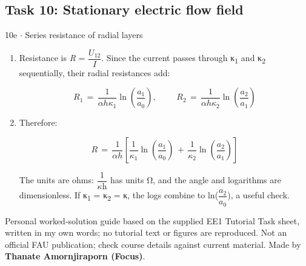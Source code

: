 \documentclass[11pt]{article}
\begin{document}
\begin{keepsection}\subsection{Task 10: Stationary electric flow field}

\begin{workedbox}{10e \ensuremath{\cdot} Series resistance of radial layers}
\begin{enumerate}
\item {}
Resistance is \textit{R} = {\small\ensuremath{\dfrac{{U}_{12}}{{I}}}}. Since the current passes through κ\textsubscript{1} and κ\textsubscript{2} sequentially, their radial resistances add:

\begin{equation*}{R}_{1}\, =\, \dfrac{1}{α{h}κ_{1}}\ln \left(\dfrac{{a}_{1}}{{a}_{0}}\right),\quad \, \quad \, {R}_{2}\, =\, \dfrac{1}{α{h}κ_{2}}\ln \left(\dfrac{{a}_{2}}{{a}_{1}}\right)\end{equation*}
\item {}
Therefore:

\begin{equation*}{R}\, =\, \dfrac{1}{α{h}}\left[\dfrac{1}{κ_{1}}\ln \left(\dfrac{{a}_{1}}{{a}_{0}}\right)\, +\, \dfrac{1}{κ_{2}}\ln \left(\dfrac{{a}_{2}}{{a}_{1}}\right)\right]\end{equation*}

The units are ohms: {\small\ensuremath{\dfrac{1}{κ\mathrm{h}}}} has units Ω, and the angle and logarithms are dimensionless. If κ\textsubscript{1} = κ\textsubscript{2} = κ, the logs combine to ln({\small\ensuremath{\dfrac{{a}_{2}}{{a}_{0}}}}), a useful check.
\end{enumerate}
\end{workedbox}

\end{keepsection}

\vfill{\small Personal worked-solution guide based on the supplied EE1 Tutorial Task sheet, written in my own words; no tutorial text or figures are reproduced. Not an official FAU publication; check course details against current material. Made by \textbf{Thanate Amornjiraporn (Focus)}.}
\end{document}

